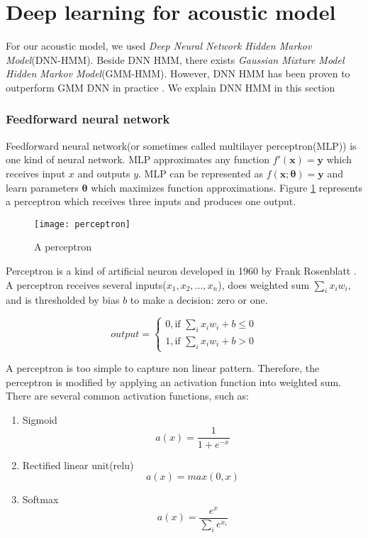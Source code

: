 \section{Deep learning for acoustic model}
For our acoustic model, we used \textit{Deep Neural Network Hidden Markov Model}(DNN-HMM). Beside DNN HMM, there exists \textit{Gaussian Mixture Model Hidden Markov Model}(GMM-HMM). However, DNN HMM has been proven to outperform GMM DNN in practice \cite{Peddinti2015ATD}. We explain DNN HMM in this section

\subsubsection{Feedforward neural network}
Feedforward neural network(or sometimes called multilayer perceptron(MLP)) is one kind of neural network. MLP approximates any function $f'(\mathbf{x})=\mathbf{y}$ which receives input $x$ and outputs $y$. MLP can be represented as $f(\mathbf{x};\mathbf{\theta})=\mathbf{y}$ and learn parameters $\mathbf{\theta}$ which maximizes function approximations. Figure \ref{perceptron} represents a perceptron which receives three inputs and produces one output.

\begin{figure}[H]
\caption{A perceptron \cite{perceptronImage}}
\label{perceptron}
\texttt{[image: perceptron]}
\centering
\end{figure}

Perceptron is a kind of artificial neuron developed in 1960 by Frank Rosenblatt \cite{Rosenblatt1960}. A perceptron receives several inputs($x_{1}, x_{2}, ..., x_{n}$), does weighted sum $\sum_{i} x_{i}w_{i}$, and is thresholded by bias $b$ to make a decision: zero or one.
 
\begin{equation}
output = 
\begin{cases}
0 , \textrm{if } \sum_{i} x_{i}w_{i} + b \leq 0 \\
1, \textrm{if } \sum_{i} x_{i}w_{i} + b > 0
\end{cases}
\end{equation}



A perceptron is too simple to capture non linear pattern. Therefore, the perceptron is modified by applying an activation function into weighted sum. There are several common activation functions, such as: 
\begin{enumerate}
\item Sigmoid
\begin{equation}
a(x) = \frac{1}{1 + e ^{-x}}
\end{equation} 

\item Rectified linear unit(relu)
\begin{equation}
a(x) = max(0,x)
\end{equation} 


\item Softmax
\begin{equation}
a(x) = \frac{e^{x}}{\sum_{i} e^{x_{i}}}
\end{equation} 

\end{enumerate}

